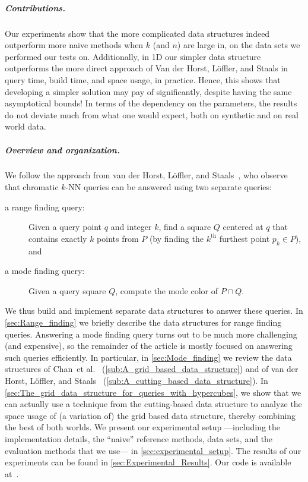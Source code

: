 \documentclass[twoside,leqno,twocolumn]{article}
\newcommand{\etal}{et al.\xspace}
\begin{document}
\subparagraph{Contributions.} Our experiments show that the more
complicated data structures indeed outperform more naive methods when $k$
(and $n$) are large in, on the data sets we performed our tests on. Additionally, in 1D our simpler data structure outperforms the more direct approach of Van der Horst, Löffler, and
Staals in query time, build time, and space usage, in practice. Hence,
this shows that developing a simpler solution may pay of
significantly, despite having the same asymptotical bounds! In terms of the dependency on the parameters, the results do not deviate much from what one would expect, both on synthetic and on real world data.

\subparagraph{Overview and organization.} We follow the approach from
van der Horst, L\"offler, and Staals~\cite{chromatic_knn2025}, who
observe that chromatic $k$-NN queries can be answered using two separate
queries:

\begin{description}
\item[a range finding query:] Given a query point $q$ and integer $k$,
  find a square $Q$ centered at $q$ that contains exactly $k$ points
  from $P$ (by finding the $k^\mathrm{th}$ furthest point
  $p_k \in P$), and
\item[a mode finding query:] Given a query square $Q$, compute the
  mode color of $P \cap Q$.
\end{description}

We thus build and implement separate data structures to answer these
queries. In \cref{sec:Range_finding} we briefly describe the
data structures for range finding queries. Answering a mode finding
query turns out to be much more challenging (and expensive), so the remainder of the article is mostly focused on answering such queries
efficiently. In particular, in \cref{sec:Mode_finding} we
review the data structures of Chan~\etal~\cite{chan2014modeQuery}
(\cref{sub:A_grid_based_data_structure}) and of van der Horst,
L\"offler, and Staals~\cite{chromatic_knn2025}
(\cref{sub:A_cutting_based_data_structure}). In
\cref{sec:The_grid_data_structure_for_queries_with_hypercubes},
we show that we can actually use a technique from the cutting-based data structure to
analyze the space usage of (a variation of) the grid based data
structure, thereby combining the best of both worlds. We present our
experimental setup ---including the implementation details, the
``naive'' reference methods, data sets, and the evaluation methods
that we use--- in \cref{sec:experimental_setup}. The results of
our experiments can be found in
\cref{sec:Experimental_Results}. Our code is available
at~\cite{code}.
\end{document}
